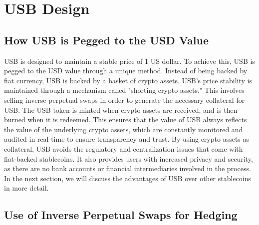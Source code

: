 
\section{USB Design}
\subsection{How USB is Pegged to the USD Value}
USB is designed to maintain a stable price of 1 US dollar.
To achieve this, USB is pegged to the USD value through a unique method. Instead of being backed by fiat currency, USB is backed by a basket of crypto assets.\newline
USB's price stability is maintained through a mechanism called "shorting crypto assets." This involves selling inverse perpetual swaps in order to generate the necessary collateral for USB.\newline
The USB token is minted when crypto assets are received, and is then burned when it is redeemed. 
This ensures that the value of USB always reflects the value of the underlying crypto assets, which are constantly monitored and audited in real-time to ensure transparency and trust.\newline
By using crypto assets as collateral, USB avoids the regulatory and centralization issues that come with fiat-backed stablecoins.
It also provides users with increased privacy and security, as there are no bank accounts or financial intermediaries involved in the process.\newline
In the next section, we will discuss the advantages of USB over other stablecoins in more detail.

\subsection{Use of Inverse Perpetual Swaps for Hedging}

